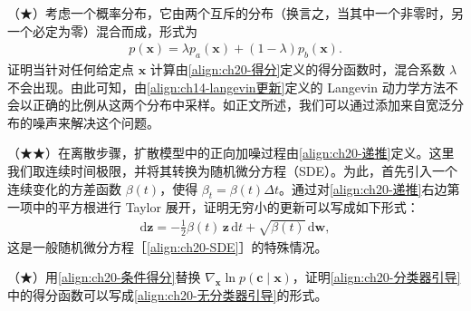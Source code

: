 \documentclass[../../main.tex]{subfiles}
\begin{document}
\begin{exercise}\label{exercise:ch20-18}
（★）考虑一个概率分布，它由两个互斥的分布（换言之，当其中一个非零时，另一个必定为零）混合而成，形式为
\begin{align}
p(\bm{x})=\lambda p_a(\bm{x})+(1-\lambda)p_b(\bm{x}).
\label{align:ch20-混合分布}
\end{align}
证明当针对任何给定点 $\bm{x}$ 计算由\eqref{align:ch20-得分}定义的得分函数时，混合系数 $\lambda$ 不会出现。由此可知，由\eqref{align:ch14-langevin更新}定义的 Langevin 动力学方法不会以正确的比例从这两个分布中采样。如正文所述，我们可以通过添加来自宽泛分布的噪声来解决这个问题。
\end{exercise}

\begin{exercise}\label{exercise:ch20-19}
（★★）在离散步骤，扩散模型中的正向加噪过程由\eqref{align:ch20-递推}定义。这里我们取连续时间极限，并将其转换为随机微分方程（SDE）。为此，首先引入一个连续变化的方差函数 $\beta(t)$，使得 $\beta_t=\beta(t)\Delta t$。通过对\eqref{align:ch20-递推}右边第一项中的平方根进行 Taylor 展开，证明无穷小的更新可以写成如下形式：
\begin{align}
\mathrm{d}\bm{z}=-\frac{1}{2}\beta(t)\,\bm{z}\,\mathrm{d}t+\sqrt{\beta(t)}\,\mathrm{d}\bm{w},
\label{align:ch20-无穷小}
\end{align}
这是一般随机微分方程［\eqref{align:ch20-SDE}］的特殊情况。
\end{exercise}

\begin{exercise}\label{exercise:ch20-20}
（★）用\eqref{align:ch20-条件得分}替换 $\nabla_{\bm{x}}\ln p(\bm{c}\mid\bm{x})$，证明\eqref{align:ch20-分类器引导}中的得分函数可以写成\eqref{align:ch20-无分类器引导}的形式。
\end{exercise}
\end{document}
